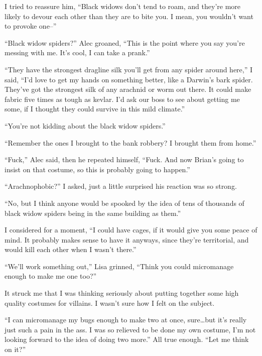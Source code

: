 I tried to reassure him, ``Black widows don't tend to roam, and they're more likely to devour each other than they are to bite you.  I mean, you wouldn't want to provoke one--''



``Black widow spiders?'' Alec groaned, ``This is the point where you say you're messing with me.  It's cool, I can take a prank.''



``They have the strongest dragline silk you'll get from any spider around here,'' I said, ``I'd love to get my hands on something better, like a Darwin's bark spider.  They've got the strongest silk of any arachnid or worm out there.  It could make fabric five times as tough as kevlar.  I'd ask our boss to see about getting me some, if I thought they could survive in this mild climate.''



``You're not kidding about the black widow spiders.''



``Remember the ones I brought to the bank robbery?  I brought them from home.''



``Fuck,'' Alec said, then he repeated himself, ``Fuck. And now Brian's going to insist on that costume, so this is probably going to happen.''



``Arachnophobic?'' I asked, just a little surprised his reaction was so strong.



``No, but I think anyone would be spooked by the idea of tens of thousands of black widow spiders being in the same building as them.''



I considered for a moment, ``I could have cages, if it would give you some peace of mind.  It probably makes sense to have it anyways, since they're territorial, and would kill each other when I wasn't there.''



``We'll work something out,'' Lisa grinned, ``Think you could micromanage enough to make me one too?''



It struck me that I was thinking seriously about putting together some high quality costumes for villains.  I wasn't sure how I felt on the subject.



``I can micromanage my bugs enough to make two at once, sure\ldots but it's really just such a pain in the ass.  I was so relieved to be done my own costume, I'm not looking forward to the idea of doing two more.''  All true enough.  ``Let me think on it?''



